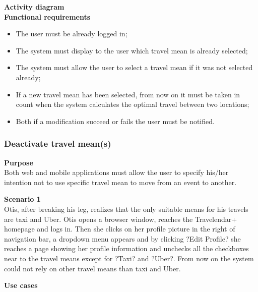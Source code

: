 \documentclass{article}
\begin{document}
	\bigskip
	\noindent
	\textbf{Activity diagram} \\
	
	
	\bigskip
	\noindent
	\textbf{Functional requirements} \\
	\begin{itemize}
		\item The user must be already logged in;
		\item The system must display to the user which travel mean is already selected;
		\item The system must allow the user to select a travel mean if it was not selected already;
		\item If a new travel mean has been selected, from now on it must be taken in count when the system calculates the optimal travel between two locations;
		\item Both if a modification succeed or fails the user must be notified.
	\end{itemize}


	\subsubsection{Deactivate travel mean(s)}
	
	\bigskip
	\noindent
	\textbf{Purpose} \\
	Both web and mobile applications must allow the user to specify his/her intention not to use specific travel mean to move from an event to another.
	
	\bigskip
	\noindent
	\textbf{Scenario 1} \\
	Otis, after breaking his leg, realizes that the only suitable means for his travels are taxi and Uber. Otis opens a browser window, reaches the Travelendar+ homepage and logs in. Then she clicks on her profile picture in the right of navigation bar, a dropdown menu appears and by clicking ?Edit Profile? she reaches a page showing her profile information and unchecks all the checkboxes near to the travel means except for ?Taxi? and ?Uber?. From now on the system could not rely on other travel means than taxi and Uber.
	
	\bigskip
	\noindent
	\textbf{Use cases} \\
	
\end{document}
